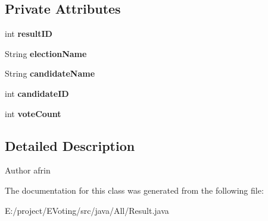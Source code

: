 \subsection*{Private Attributes}
\begin{DoxyCompactItemize}
\item 
\mbox{\label{class_models_1_1_result_a60027057c527c307303125f345c98624}} 
int {\bfseries result\+ID}
\item 
\mbox{\label{class_models_1_1_result_a6018b4fb70995eeb35d8e6d79ea20054}} 
String {\bfseries election\+Name}
\item 
\mbox{\label{class_models_1_1_result_a8a6c1385bc5a6212c6836c47e55c2460}} 
String {\bfseries candidate\+Name}
\item 
\mbox{\label{class_models_1_1_result_a09ae938eccd72a28e204ff882690a9d2}} 
int {\bfseries candidate\+ID}
\item 
\mbox{\label{class_models_1_1_result_afcb3c041c6ecc4a4593006631c6b21be}} 
int {\bfseries vote\+Count}
\end{DoxyCompactItemize}


\subsection{Detailed Description}
\begin{DoxyAuthor}{Author}
afrin 
\end{DoxyAuthor}


The documentation for this class was generated from the following file\+:\begin{DoxyCompactItemize}
\item 
E\+:/project/\+E\+Voting/src/java/\+All/Result.\+java\end{DoxyCompactItemize}
